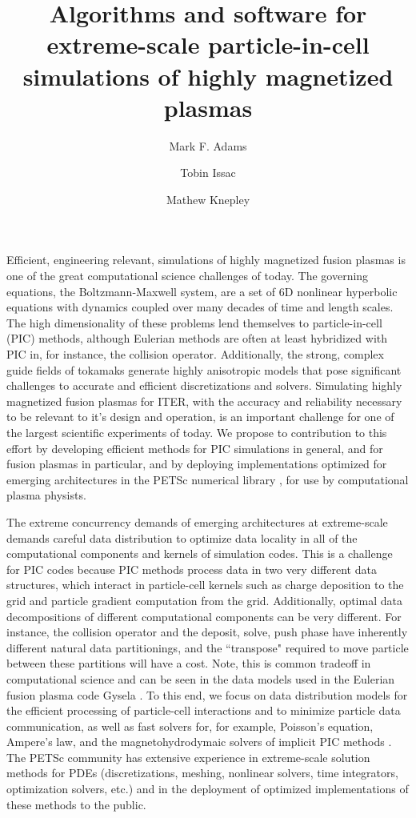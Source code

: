 \documentclass[review]{siamart}
\title{Algorithms and software for extreme-scale particle-in-cell simulations of highly magnetized plasmas}
\author{Mark F. Adams\and Tobin Issac\and Mathew Knepley}
\begin{document}
\maketitle

Efficient, engineering relevant, simulations of highly magnetized fusion plasmas is one of the great computational science challenges of today.
The governing equations, the Boltzmann-Maxwell system, are a set of 6D nonlinear hyperbolic equations with dynamics coupled over many decades of time and length scales.
The high dimensionality of these problems lend themselves to particle-in-cell (PIC) methods, although Eulerian methods are often at least hybridized with PIC in, for instance, the collision operator.
Additionally, the strong, complex guide fields of tokamaks generate highly anisotropic models that pose significant challenges to accurate and efficient discretizations and solvers.
Simulating highly magnetized fusion plasmas for ITER, with the accuracy and reliability necessary to be relevant to it's design and operation, is an important challenge for one of the largest scientific experiments of today.
We propose to contribution to this effort by developing efficient methods for PIC simulations in general, and for fusion plasmas in particular, and by deploying implementations optimized for emerging architectures in the PETSc numerical library \cite{}, for use by computational plasma physists.

The extreme concurrency demands of emerging architectures at extreme-scale demands careful data distribution to optimize data locality in all of the computational components and kernels of simulation codes.
This is a challenge for PIC codes because PIC methods process data in two very different data structures, which interact in particle-cell kernels such as charge deposition to the grid and particle gradient computation from the grid.
Additionally, optimal data decompositions of different computational components can be very different.
For instance, the collision operator and the deposit, solve, push phase have inherently different natural data partitionings, and the ``transpose" required to move particle between these partitions will have a cost.
Note, this is common tradeoff in computational science and can be seen in the data models used in the Eulerian fusion plasma code Gysela \cite{Gysela16}.
To this end, we focus on data distribution models for the efficient processing of particle-cell interactions and to minimize particle data communication, as well as fast solvers for, for example, Poisson's equation, Ampere's law, and the magnetohydrodymaic  solvers of implicit PIC methods \cite{DBLP:journals/cphysics/ChenC15}.
The PETSc community has extensive experience in extreme-scale solution methods for PDEs (discretizations, meshing,  nonlinear solvers, time integrators, optimization solvers, etc.) and in the deployment of optimized implementations of these methods to the public.
\end{document}
